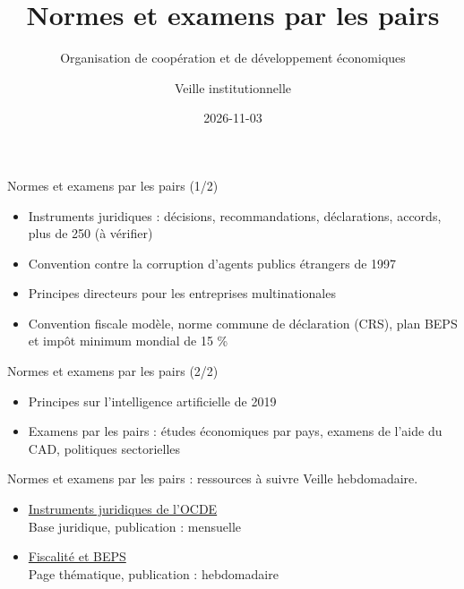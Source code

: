 \documentclass[aspectratio=169,11pt]{beamer}
\title{Normes et examens par les pairs}
\subtitle{Organisation de coopération et de développement économiques}
\author{Veille institutionnelle}
\date{2026-11-03}
\begin{document}
\begin{frame}\titlepage\end{frame}

\begin{frame}{Normes et examens par les pairs (1/2)}
\begin{itemize}
\item Instruments juridiques : décisions, recommandations, déclarations, accords, plus de 250 (à vérifier)
\item Convention contre la corruption d'agents publics étrangers de 1997
\item Principes directeurs pour les entreprises multinationales
\item Convention fiscale modèle, norme commune de déclaration (CRS), plan BEPS et impôt minimum mondial de 15 \%
\end{itemize}
\end{frame}

\begin{frame}{Normes et examens par les pairs (2/2)}
\begin{itemize}
\item Principes sur l'intelligence artificielle de 2019
\item Examens par les pairs : études économiques par pays, examens de l'aide du CAD, politiques sectorielles
\end{itemize}
\end{frame}

\begin{frame}{Normes et examens par les pairs : ressources à suivre}
\small
Veille hebdomadaire.
\begin{itemize}
\item \href{https://legalinstruments.oecd.org}{Instruments juridiques de l'OCDE}\\{\footnotesize Base juridique, publication : mensuelle}
\item \href{https://www.oecd.org/en/topics/policy-areas/tax.html}{Fiscalité et BEPS}\\{\footnotesize Page thématique, publication : hebdomadaire}
\end{itemize}
\end{frame}
\end{document}
